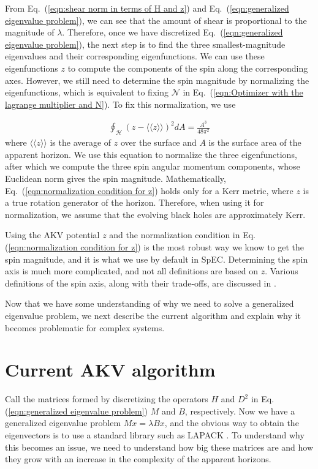 \documentclass{iopjournal}
\begin{document}
From Eq.~(\ref{eqn:shear norm in terms of H and z}) and Eq.~(\ref{eqn:generalized eigenvalue problem}), we can see that the amount of shear is proportional to the magnitude of $\lambda$. Therefore, once we have discretized Eq.~(\ref{eqn:generalized eigenvalue problem}), the next step is to find the three smallest-magnitude eigenvalues and their corresponding eigenfunctions. We can use these eigenfunctions $z$ to compute the components of the spin along the corresponding axes. However, we still need to determine the spin magnitude by normalizing the eigenfunctions, which is equivalent to fixing $\mathcal{N}$ in Eq.~(\ref{eqn:Optimizer with the lagrange multiplier and N}). To fix this normalization, we use

\begin{align}
\oint_{\mathcal{H}}(z-\langle\langle z\rangle\rangle)^2 d A=\frac{A^3}{48 \pi^2}
\label{eqn:normalization condition for z}
\end{align}
where $\langle\langle z\rangle\rangle$ is the average of $z$ over the surface and $A$ is the surface area of the apparent horizon. We use this equation to normalize the three eigenfunctions, after which we compute the three spin angular momentum components, whose Euclidean norm gives the spin magnitude. Mathematically, Eq.~(\ref{eqn:normalization condition for z}) holds only for a Kerr metric, where $z$ is a true rotation generator of the horizon. Therefore, when using it for normalization, we assume that the evolving black holes are approximately Kerr.

Using the AKV potential $z$ and the normalization condition in Eq.(\ref{eqn:normalization condition for z}) is the most robust way we know to get the spin magnitude, and it is what we use by default in SpEC. Determining the spin axis is much more complicated, and not all definitions are based on $z$. Various definitions of the spin axis, along with their trade-offs, are discussed in \cite{Owen:2017yaj}.

Now that we have some understanding of why we need to solve a generalized eigenvalue problem, we next describe the current algorithm and explain why it becomes problematic for complex systems.

\section{\label{sec:Current AKV algorithm} Current AKV algorithm}

Call the matrices formed by discretizing the operators $H$ and $D^2$ in Eq.(\ref{eqn:generalized eigenvalue problem}) $M$ and $B$, respectively. Now we have a generalized eigenvalue problem $Mx = \lambda Bx$, and the obvious way to obtain the eigenvectors is to use a standard library such as LAPACK \cite{lapack_users_guide}. To understand why this becomes an issue, we need to understand how big these matrices are and how they grow with an increase in the complexity of the apparent horizons.
\end{document}
